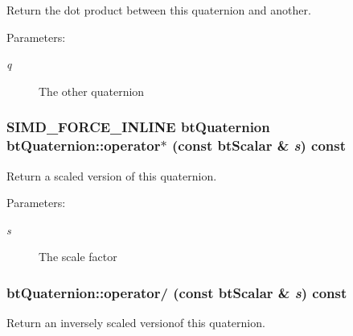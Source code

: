 Return the dot product between this quaternion and another. 

\begin{Desc}
\item[Parameters:]
\begin{description}
\item[{\em q}]The other quaternion \end{description}
\end{Desc}
\hypertarget{classbt_quaternion_cc3942c106bc598c0d4550d30128a7d1}{
\subsubsection[operator$\ast$]{\setlength{\rightskip}{0pt plus 5cm}SIMD\_\-FORCE\_\-INLINE {\bf btQuaternion} btQuaternion::operator$\ast$ (const btScalar \& {\em s}) const}}
\label{classbt_quaternion_cc3942c106bc598c0d4550d30128a7d1}


Return a scaled version of this quaternion. 

\begin{Desc}
\item[Parameters:]
\begin{description}
\item[{\em s}]The scale factor \end{description}
\end{Desc}
\hypertarget{classbt_quaternion_4208a1ae41ae01d4dfa0d25792441213}{
\subsubsection[operator/]{ btQuaternion::operator/ (const btScalar \& {\em s}) const}}
\label{classbt_quaternion_4208a1ae41ae01d4dfa0d25792441213}


Return an inversely scaled versionof this quaternion. 

